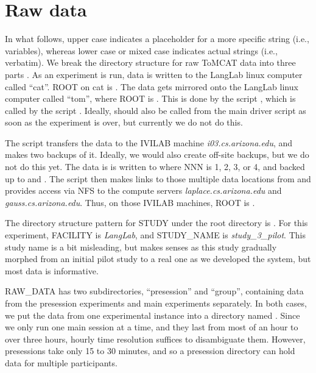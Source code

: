\section{Raw data}

In what follows, upper case indicates
a placeholder for a more specific string (i.e., variables), whereas lower case or mixed case
indicates actual strings (i.e., verbatim).
We break the directory structure for raw ToMCAT data into three parts
.
As an experiment is run, data is written to the LangLab linux computer called
``cat''. ROOT on cat is
. The data gets mirrored onto the LangLab linux computer called
``tom'', where ROOT is .
This is done by the script , which is called by the script
. Ideally,  should also be
called from the main driver script as soon as the experiment is over, but
currently we do not do this.

The script  transfers the data to the IVILAB machine
\textit{i03.cs.arizona.edu}, and makes two backups of it.  Ideally, we would
also create off-site backups, but we do not do this yet. The data is is
written to
 where NNN is 1, 2, 3, or 4, and backed up to
 and .
The script  then makes links to those multiple data
locations from  and provides access via NFS to the compute
servers \textit{laplace.cs.arizona.edu} and \textit{gauss.cs.arizona.edu}.
Thus, on those IVILAB machines, ROOT is .

The directory structure pattern for STUDY under the root directory is
. For this experiment, FACILITY is
\textit{LangLab}, and STUDY\_NAME is \textit{study\_3\_pilot}.
This study name is a bit misleading, but makes senses as this study
gradually morphed from an initial pilot study to a real one as we developed the
system, but most data is informative.

RAW\_DATA has two subdirectories, ``presession'' and ``group'', containing data
from the presession experiments and main experiments separately. In both cases, we put the
data from one experimental instance into a directory named
. Since we only run one main session at a time, and
they last from most of an hour to over three hours, hourly time resolution
suffices to disambiguate them. However, presessions take only 15 to 30 minutes,
and so a presession directory can hold data for multiple participants.

